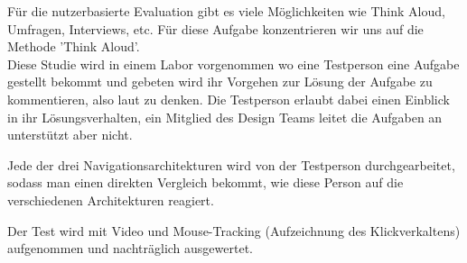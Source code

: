 Für die nutzerbasierte Evaluation gibt es viele Möglichkeiten
wie Think Aloud, Umfragen, Interviews, etc. Für diese Aufgabe konzentrieren wir uns auf die Methode 'Think Aloud'.
\\
Diese Studie wird in einem Labor vorgenommen wo eine Testperson eine Aufgabe gestellt
bekommt und gebeten wird ihr Vorgehen zur Lösung der Aufgabe zu kommentieren, also laut zu denken. 
Die Testperson erlaubt dabei einen Einblick in ihr Lösungsverhalten, 
ein Mitglied des Design Teams leitet die Aufgaben an unterstützt aber nicht.

Jede der drei Navigationsarchitekturen wird von der Testperson durchgearbeitet, sodass
man einen direkten Vergleich bekommt, wie diese Person auf die verschiedenen Architekturen reagiert. 

Der Test wird mit Video und Mouse-Tracking (Aufzeichnung des Klickverkaltens) 
aufgenommen und nachträglich ausgewertet.